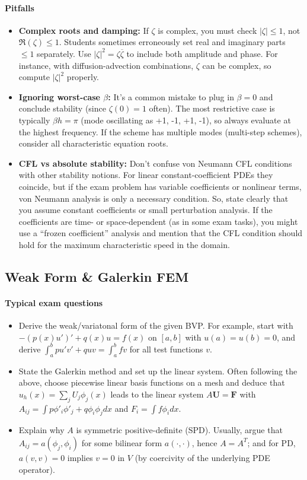 \documentclass[a4paper,11pt]{article}
\begin{document}
\paragraph{Pitfalls}
\begin{itemize}
    \item \textbf{Complex roots and damping:} If $\zeta$ is complex, you must check $|\zeta| \le 1$, not $\Re(\zeta) \le 1$. Students sometimes erroneously set real and imaginary parts $\le 1$ separately. Use $|\zeta|^2 = \zeta \overline{\zeta}$ to include both amplitude and phase. For instance, with diffusion-advection combinations, $\zeta$ can be complex, so compute $|\zeta|^2$ properly.
    \item \textbf{Ignoring worst-case $\beta$:} It's a common mistake to plug in $\beta=0$ and conclude stability (since $\zeta(0)=1$ often). The most restrictive case is typically $\beta h = \pi$ (mode oscillating as +1, -1, +1, -1), so always evaluate at the highest frequency. If the scheme has multiple modes (multi-step schemes), consider all characteristic equation roots.
    \item \textbf{CFL vs absolute stability:} Don't confuse von Neumann CFL conditions with other stability notions. For linear constant-coefficient PDEs they coincide, but if the exam problem has variable coefficients or nonlinear terms, von Neumann analysis is only a necessary condition. So, state clearly that you assume constant coefficients or small perturbation analysis. If the coefficients are time- or space-dependent (as in some exam tasks), you might use a ``frozen coefficient'' analysis and mention that the CFL condition should hold for the maximum characteristic speed in the domain.
\end{itemize}

\clearpage

\subsection{Weak Form \& Galerkin FEM}
\paragraph{Typical exam questions}
\begin{itemize}
    \item Derive the weak/variatonal form of the given BVP. For example, start with $- (p(x)u')' + q(x)u = f(x)$ on $[a,b]$ with $u(a)=u(b)=0$, and derive $\int_a^b pu'v' + quv = \int_a^b fv$ for all test functions $v$.
    \item State the Galerkin method and set up the linear system. Often following the above, choose piecewise linear basis functions on a mesh and deduce that $u_h(x)=\sum_j U_j \phi_j(x)$ leads to the linear system $A\mathbf{U}=\mathbf{F}$ with $A_{ij}=\int p\phi'_i\phi'_j + q\phi_i\phi_jdx$ and $F_i=\int f\phi_idx$.
    \item Explain why $A$ is symmetric positive-definite (SPD). Usually, argue that $A_{ij} = a(\phi_j,\phi_i)$ for some bilinear form $a(\cdot,\cdot)$, hence $A=A^T$; and for PD, $a(v,v)=0$ implies $v=0$ in $V$ (by coercivity of the underlying PDE operator).
\end{itemize}
\end{document}
